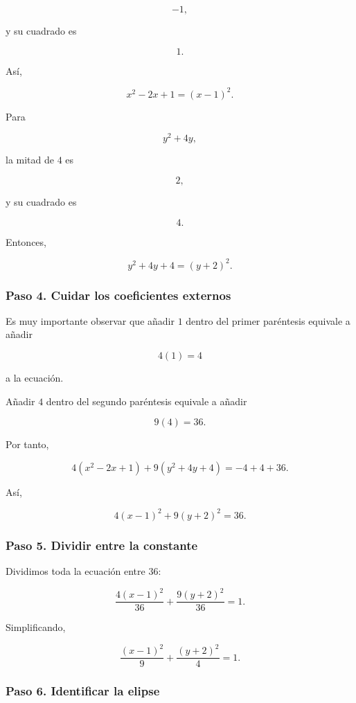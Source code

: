 \documentclass[12pt]{article}
\theoremstyle{plain}
\theoremstyle{definition}
\theoremstyle{remark}
\begin{document}
{\[
-1,
\]

y su cuadrado es

\[
1.
\]

Así,

\[
x^2-2x+1=(x-1)^2.
\]

Para

\[
y^2+4y,
\]

la mitad de \(4\) es

\[
2,
\]

y su cuadrado es

\[
4.
\]

Entonces,

\[
y^2+4y+4=(y+2)^2.
\]

\subsubsection*{Paso 4. Cuidar los coeficientes externos}

Es muy importante observar que añadir \(1\) dentro del primer
paréntesis equivale a añadir

\[
4(1)=4
\]

a la ecuación.

Añadir \(4\) dentro del segundo paréntesis equivale a añadir

\[
9(4)=36.
\]

Por tanto,

\[
4(x^2-2x+1)+9(y^2+4y+4)
=
-4+4+36.
\]

Así,

\[
4(x-1)^2+9(y+2)^2=36.
\]

\subsubsection*{Paso 5. Dividir entre la constante}

Dividimos toda la ecuación entre \(36\):

\[
\frac{4(x-1)^2}{36}
+
\frac{9(y+2)^2}{36}
=
1.
\]

Simplificando,

\[
\boxed{
\frac{(x-1)^2}{9}
+
\frac{(y+2)^2}{4}
=
1.
}
\]

\subsubsection*{Paso 6. Identificar la elipse}

}
\end{document}
